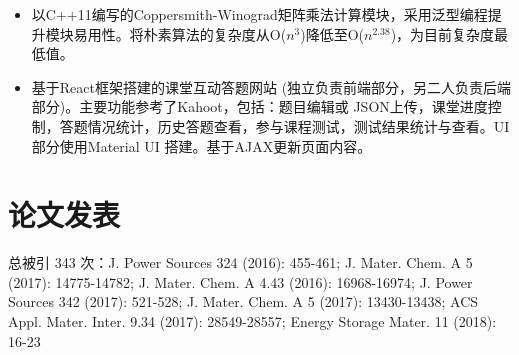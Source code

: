 \documentclass{resume}
\begin{document}
\begin{itemize}
  \item 以C++11编写的Coppersmith-Winograd矩阵乘法计算模块，采用泛型编程提升模块易用性。将朴素算法的复杂度从O($n^3$)降低至O($n^{2.38}$)，为目前复杂度最低值。
\end{itemize}

\begin{itemize}
  \item 基于React框架搭建的课堂互动答题网站 (独立负责前端部分，另二人负责后端部分)。主要功能参考了Kahoot，包括：题目编辑或
  JSON上传，课堂进度控制，答题情况统计，历史答题查看，参与课程测试，测试结果统计与查看。UI 部分使用Material UI 搭建。基于AJAX更新页面内容。
\end{itemize}



\section{论文发表}
 总被引 343 次：J. Power Sources 324 (2016): 455-461; J. Mater. Chem. A 5 (2017): 14775-14782; J. Mater. Chem. A 4.43
  (2016): 16968-16974; J. Power Sources 342 (2017): 521-528; J. Mater. Chem. A 5 (2017): 13430-13438; ACS
  Appl. Mater. Inter. 9.34 (2017): 28549-28557; Energy Storage Mater. 11 (2018): 16-23


\end{document}
